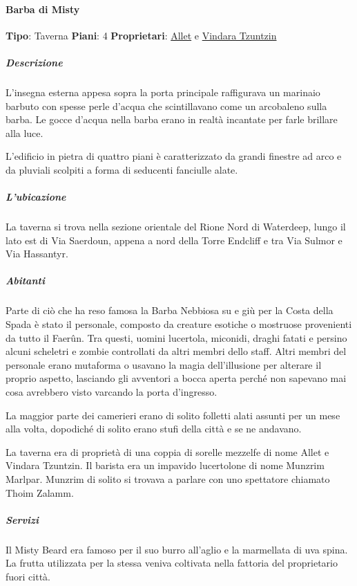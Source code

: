 \documentclass{article}
\begin{document}
                  \paragraph{Barba di Misty}
                  \textbf{Tipo}: Taverna
                  \textbf{Piani}: 4
                  \textbf{Proprietari}: \href{https://forgottenrealms.fandom.com/wiki/Allet_Tzuntzin}{Allet} e  \href{https://forgottenrealms.fandom.com/wiki/Vindara_Tzuntzin}{Vindara Tzuntzin}
                      \subparagraph{Descrizione}
                        L'insegna esterna appesa sopra la porta principale raffigurava un marinaio barbuto con spesse perle d'acqua che scintillavano come un arcobaleno sulla barba. Le gocce d'acqua nella barba erano in realtà incantate per farle brillare alla luce.

                        L'edificio in pietra di quattro piani è caratterizzato da grandi finestre ad arco e da pluviali scolpiti a forma di seducenti fanciulle alate.

                      \subparagraph{L'ubicazione}
                        La taverna si trova nella sezione orientale del Rione Nord di Waterdeep, lungo il lato est di Via Saerdoun, appena a nord della Torre Endcliff e tra Via Sulmor e Via Hassantyr.

                      \subparagraph{Abitanti}
                        Parte di ciò che ha reso famosa la Barba Nebbiosa su e giù per la Costa della Spada è stato il personale, composto da creature esotiche o mostruose provenienti da tutto il Faerûn. Tra questi, uomini lucertola, miconidi, draghi fatati e persino alcuni scheletri e zombie controllati da altri membri dello staff. Altri membri del personale erano mutaforma o usavano la magia dell'illusione per alterare il proprio aspetto, lasciando gli avventori a bocca aperta perché non sapevano mai cosa avrebbero visto varcando la porta d'ingresso.

                        La maggior parte dei camerieri erano di solito folletti alati assunti per un mese alla volta, dopodiché di solito erano stufi della città e se ne andavano.

                        La taverna era di proprietà di una coppia di sorelle mezzelfe di nome Allet e Vindara Tzuntzin. Il barista era un impavido lucertolone di nome Munzrim Marlpar. Munzrim di solito si trovava a parlare con uno spettatore chiamato Thoim Zalamm.

                      \subparagraph{Servizi}
                        Il Misty Beard era famoso per il suo burro all'aglio e la marmellata di uva spina. La frutta utilizzata per la stessa veniva coltivata nella fattoria del proprietario fuori città.
\end{document}
